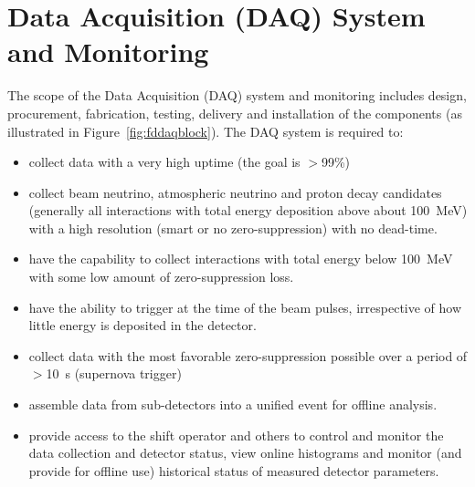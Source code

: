 \section{Data Acquisition (DAQ) System and Monitoring} 
\label{sec:detectors-fd-ref-daq}

The scope of the Data Acquisition (DAQ) system and monitoring includes design, procurement,
fabrication, testing, delivery and installation of the components (as illustrated in Figure~\ref{fig:fddaqblock}).  The DAQ system is required to:
\begin{itemize}
\item collect data with a very high uptime (the goal is $>$99\%)
\item collect beam neutrino, atmospheric neutrino and proton
  decay candidates (generally all interactions with total energy deposition
  above about 100~MeV) with a high resolution (smart or no
  zero-suppression) with no dead-time. 
\item have the capability to collect interactions with total energy
  below 100~MeV with some
 low amount of zero-suppression loss.
\item have the ability to trigger at the time of the beam pulses,
  irrespective of how little energy is deposited in the detector.
\item collect data with the most favorable zero-suppression possible over a
  period of $>$10~s (supernova trigger)
\item assemble data from sub-detectors into a unified
  event for offline analysis.
\item provide access to the shift operator and others to control and
  monitor the data collection and detector status, view online
  histograms and monitor (and provide for offline use) historical
  status of measured detector parameters. 
\end{itemize}

